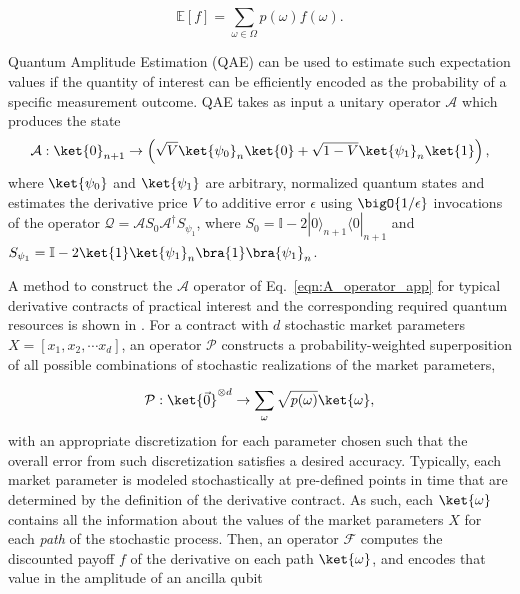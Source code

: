 \begin{enumerate}
\begin{equation}
	\label{eqn:derivative_exp_value}
\mathbb{E}[f] = \sum_{\omega \in \Omega}p(\omega)f(\omega).
\end{equation}

Quantum Amplitude Estimation (QAE) \cite{brassard2002quantum, montanaro2015quantum} can be used to estimate such expectation values if the quantity of interest can be efficiently encoded as the probability of a specific measurement outcome.
QAE takes as input a unitary operator $\mathcal{A}$ which produces the state
\begin{equation}
	\label{eqn:A_operator_app}
    \mathcal{A} : \ket{0}_{n+1} \rightarrow \left( \sqrt{V}\ket{\psi_0}_n\ket{0} + \sqrt{1-V}\ket{\psi_1}_n\ket{1} \right),
\end{equation}
where $\ket{\psi_0}$ and $\ket{\psi_1}$ are arbitrary, normalized quantum states and estimates the derivative price $V$ to additive error $\epsilon$ using $\bigO{1/\epsilon}$ invocations of the operator $\mathcal{Q} = \mathcal{A}S_0\mathcal{A}^{\dagger}S _{\psi_1}$, where $S_0 = \mathbb{I} - 2 |0\rangle_{n+1}\langle 0|_{n+1}$ and $S_{\psi_1} = \mathbb{I} - 2\ket{1}\ket{\psi_1}_n\bra{1}\bra{\psi_1}_n$.

A method to construct the $\mathcal{A}$ operator of Eq.~\eqref{eqn:A_operator_app} for typical derivative contracts of practical interest and the corresponding required quantum resources is shown in \cite{chakrabarti2021threshold}.
For a contract with $d$ stochastic market parameters $X = [x_1, x_2, \cdots x_d]$, an operator $\mathcal{P}$ constructs a probability-weighted superposition of all possible combinations of stochastic realizations of the market parameters,

\begin{equation}
	\label{eqn:derivative_path_loading}
	\mathcal{P} :\ket{\vec{0}}^{\otimes d} \rightarrow \sum_{\omega}\sqrt{p(\omega)}\ket{\omega},
\end{equation}
with an appropriate discretization for each parameter chosen such that the overall error from such discretization satisfies a desired accuracy.
Typically, each market parameter is modeled stochastically at pre-defined points in time that are determined by the definition of the derivative contract.
As such, each $\ket{\omega}$ contains all the information about the values of the market parameters $X$ for each \emph{path} of the stochastic process.
Then, an operator $\mathcal{F}$ computes the discounted payoff $f$ of the derivative on each path $\ket{\omega}$, and encodes that value in the amplitude of an ancilla qubit


\end{enumerate}
